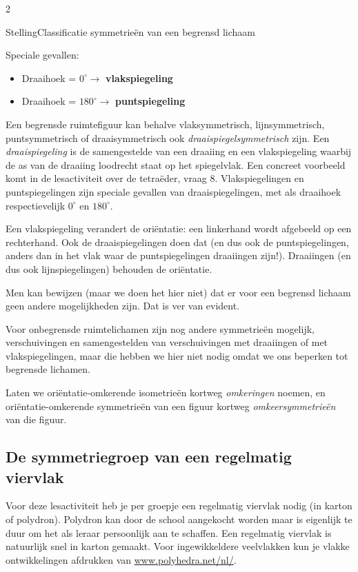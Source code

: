 \begin{multicols}{2}
\begin{kader}{Stelling}{Classificatie symmetrieën van een begrensd lichaam}
\begin{itemize}
	    Speciale gevallen:
	    \begin{itemize}
	        \item  Draaihoek = $0^\circ \rightarrow$ \textbf{vlakspiegeling}
	         
	        \item Draaihoek = $180^\circ \rightarrow$ \textbf{puntspiegeling}
	    \end{itemize}
	  
	\end{itemize}
	\end{kader}
    Een begrensde ruimtefiguur kan behalve vlaksymmetrisch, lijnsymmetrisch, puntsymmetrisch of draaisymmetrisch ook \emph{draaispiegelsymmetrisch} zijn. Een \emph{draaispiegeling} is de samengestelde van een draaiing en een vlakspiegeling waarbij de as van de draaiing loodrecht staat op het spiegelvlak. Een concreet voorbeeld komt in de lesactiviteit over de tetraëder, vraag 8. Vlakspiegelingen en puntspiegelingen zijn speciale gevallen van draaispiegelingen, met als draaihoek respectievelijk $0^\circ$ en $180^\circ$.
	
	Een vlakspiegeling verandert de oriëntatie: een linkerhand wordt afgebeeld op een rechterhand. Ook de draaispiegelingen doen dat (en dus ook de puntspiegelingen, anders dan in het vlak waar de puntspiegelingen draaiingen zijn!). Draaiingen (en dus ook lijnspiegelingen) behouden de oriëntatie.

 Men kan bewijzen (maar we doen het hier niet) dat er voor een begrensd lichaam geen andere mogelijkheden zijn. Dat is ver van evident.
 
	
	 Voor onbegrensde ruimtelichamen zijn nog andere symmetrieën mogelijk, verschuivingen en samengestelden van verschuivingen met draaiingen of met vlakspiegelingen, maar die hebben we hier niet nodig omdat we ons beperken tot begrensde lichamen.
 
 Laten we oriëntatie-omkerende isometrieën kortweg \emph{omkeringen} noemen, en oriëntatie-omkerende symmetrieën van een figuur kortweg \emph{omkeersymmetrieën} van die figuur.
	
	
\subsection{De symmetriegroep van een regelmatig viervlak}
	
	Voor deze lesactiviteit heb je per groepje een regelmatig viervlak nodig (in karton of polydron). Polydron kan door de school aangekocht worden maar is eigenlijk te duur om het als leraar persoonlijk aan te schaffen. Een regelmatig viervlak is natuurlijk snel in karton gemaakt. Voor ingewikkeldere veelvlakken kun je  vlakke ontwikkelingen afdrukken van \url{www.polyhedra.net/nl/}.
	
\end{multicols}
	
